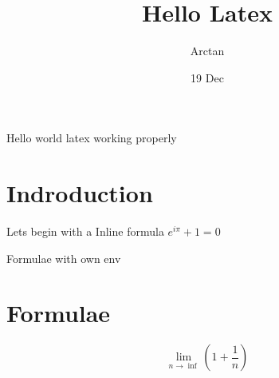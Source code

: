 \documentclass{article}
\title{Hello Latex}
\author{Arctan}
\date{19 Dec}
\begin{document}
    \maketitle
    Hello world  latex working properly
    \section{Indroduction}

    Lets begin with a Inline formula $e^{i\pi} + 1 =0$

    Formulae with own env
    \section{Formulae}
    $$ \lim_{n\to\inf} \left(1+\frac{1}{n}\right) $$
\end{document}
